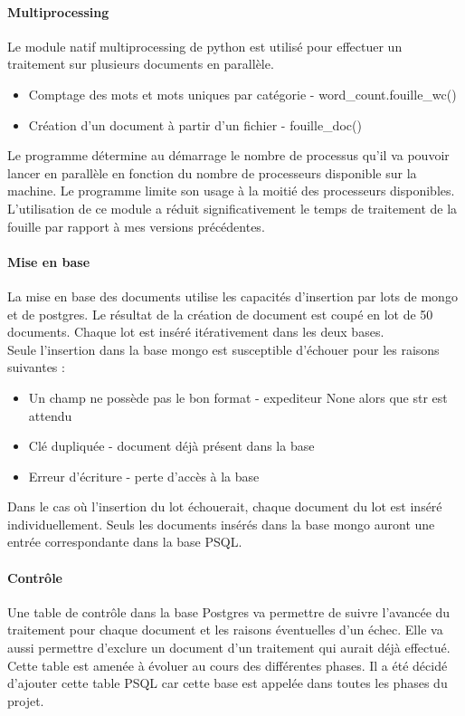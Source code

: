     \paragraph{Multiprocessing}
        Le module natif multiprocessing de python est utilisé pour effectuer un traitement sur plusieurs documents en parallèle.
        \begin{itemize}
            \item Comptage des mots et mots uniques par catégorie - word\_count.fouille\_wc()
            \item Création d'un document à partir d'un fichier - fouille\_doc()
        \end{itemize}
        Le programme détermine au démarrage le nombre de processus qu'il va pouvoir lancer en parallèle en fonction du nombre de processeurs disponible sur la machine.
        Le programme limite son usage à la moitié des processeurs disponibles.\\
        L'utilisation de ce module a réduit significativement le temps de traitement de la fouille par rapport à mes versions précédentes.

    \paragraph{Mise en base}
        La mise en base des documents utilise les capacités d'insertion par lots de mongo et de postgres.
        Le résultat de la création de document est coupé en lot de 50 documents.
        Chaque lot est inséré itérativement dans les deux bases.\\
        Seule l'insertion dans la base mongo est susceptible d'échouer pour les raisons suivantes :
        \begin{itemize}
            \item Un champ ne possède pas le bon format - expediteur None alors que str est attendu
            \item Clé dupliquée - document déjà présent dans la base
            \item Erreur d'écriture - perte d'accès à la base
        \end{itemize}
        Dans le cas où l'insertion du lot échouerait, chaque document du lot est inséré individuellement.
        Seuls les documents insérés dans la base mongo auront une entrée correspondante dans la base PSQL\@.

    \paragraph{Contrôle}
        Une table de contrôle dans la base Postgres va permettre de suivre l'avancée du traitement pour chaque document et les raisons éventuelles d'un échec.
        Elle va aussi permettre d'exclure un document d'un traitement qui aurait déjà effectué.
        Cette table est amenée à évoluer au cours des différentes phases.
        Il a été décidé d'ajouter cette table PSQL car cette base est appelée dans toutes les phases du projet.


